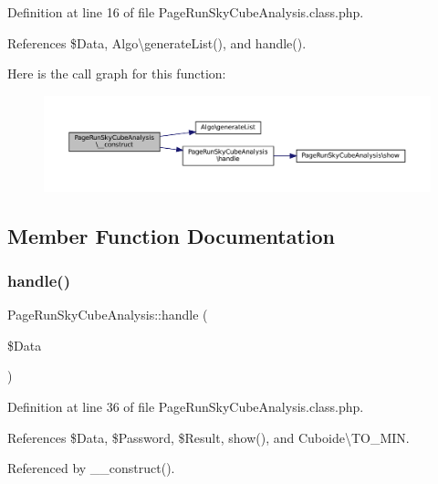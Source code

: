 Definition at line 16 of file Page\+Run\+Sky\+Cube\+Analysis.\+class.\+php.



References \$\+Data, Algo\textbackslash{}generate\+List(), and handle().

Here is the call graph for this function\+:
\nopagebreak
\begin{figure}[H]
\begin{center}
\leavevmode
\includegraphics[width=350pt]{class_page_run_sky_cube_analysis_afee4c044a994602e29c85902c3a98577_cgraph}
\end{center}
\end{figure}


\subsection{Member Function Documentation}
\mbox{\label{class_page_run_sky_cube_analysis_a48e0977cfbadfc0696a82bd017f2c563}} 
\subsubsection{\texorpdfstring{handle()}{handle()}}
{\footnotesize\ttfamily Page\+Run\+Sky\+Cube\+Analysis\+::handle (\begin{DoxyParamCaption}\item[{}]{\$\+Data }\end{DoxyParamCaption})\hspace{0.3cm}{\ttfamily [protected]}}



Definition at line 36 of file Page\+Run\+Sky\+Cube\+Analysis.\+class.\+php.



References \$\+Data, \$\+Password, \$\+Result, show(), and Cuboide\textbackslash{}\+T\+O\+\_\+\+M\+IN.



Referenced by \+\_\+\+\_\+construct().

